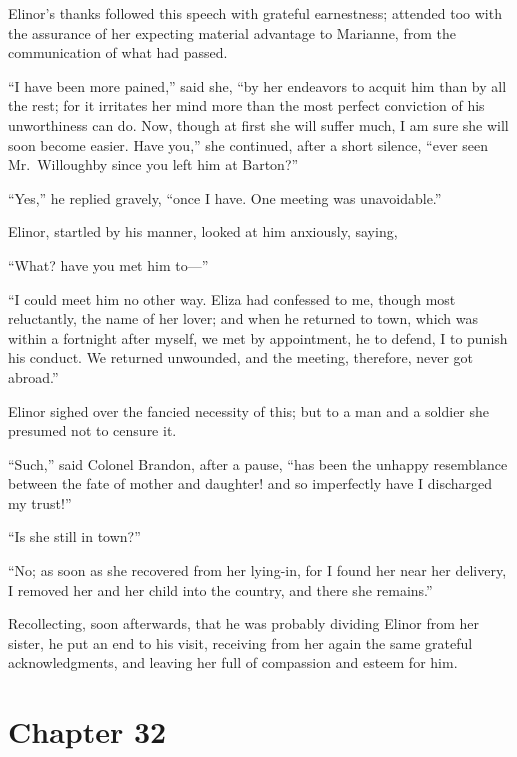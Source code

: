 Elinor's thanks followed this speech with grateful
earnestness; attended too with the assurance of her
expecting material advantage to Marianne, from the
communication of what had passed.

``I have been more pained,'' said she, ``by her
endeavors to acquit him than by all the rest; for it
irritates her mind more than the most perfect conviction
of his unworthiness can do.  Now, though at first she
will suffer much, I am sure she will soon become easier.
Have you,'' she continued, after a short silence,
``ever seen Mr.\ Willoughby since you left him at Barton?''

``Yes,'' he replied gravely, ``once I have.  One meeting
was unavoidable.''

Elinor, startled by his manner, looked at him anxiously,
saying,

``What? have you met him to---''

``I could meet him no other way.  Eliza had confessed
to me, though most reluctantly, the name of her lover;
and when he returned to town, which was within a fortnight
after myself, we met by appointment, he to defend,
I to punish his conduct.  We returned unwounded,
and the meeting, therefore, never got abroad.''

Elinor sighed over the fancied necessity of this;
but to a man and a soldier she presumed not to censure it.

``Such,'' said Colonel Brandon, after a pause,
``has been the unhappy resemblance between the fate of mother
and daughter! and so imperfectly have I discharged my trust!''

``Is she still in town?''

``No; as soon as she recovered from her lying-in,
for I found her near her delivery, I removed her and her
child into the country, and there she remains.''

Recollecting, soon afterwards, that he was probably
dividing Elinor from her sister, he put an end to his visit,
receiving from her again the same grateful acknowledgments,
and leaving her full of compassion and esteem for him.



\chapter{Chapter 32}


